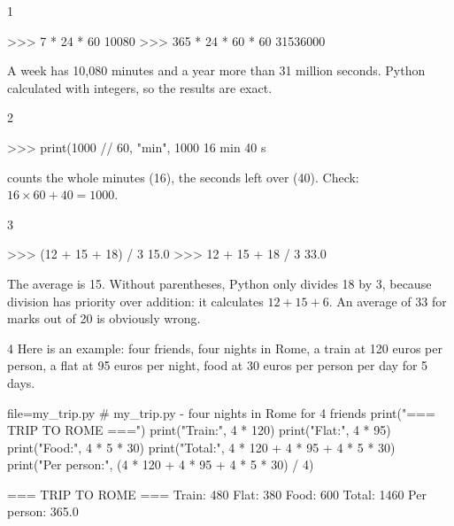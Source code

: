 
\begin{corrigeatoi}{1}
\begin{console}
>>> 7 * 24 * 60
10080
>>> 365 * 24 * 60 * 60
31536000
\end{console}
A week has 10,080 minutes and a year more than 31 million seconds. Python calculated with integers,
so the results are exact.
\end{corrigeatoi}

\begin{corrigeatoi}{2}
\begin{console}
>>> print(1000 // 60, "min", 1000 %
16 min 40 s
\end{console}
 counts the whole minutes (16),  the seconds left over (40). Check:
$16 \times 60 + 40 = 1000$.
\end{corrigeatoi}

\begin{corrigeatoi}{3}
\begin{console}
>>> (12 + 15 + 18) / 3
15.0
>>> 12 + 15 + 18 / 3
33.0
\end{console}
The average is 15. Without parentheses, Python only divides 18 by 3, because division has priority
over addition: it calculates $12 + 15 + 6$. An average of 33 for marks out of 20 is obviously wrong.
\end{corrigeatoi}

\begin{corrigeatoi}{4}
Here is an example: four friends, four nights in Rome, a train at 120 euros per person, a flat at
95 euros per night, food at 30 euros per person per day for 5 days.
\begin{code}{file=my_trip.py}
# my_trip.py - four nights in Rome for 4 friends
print("=== TRIP TO ROME ===")
print("Train:", 4 * 120)
print("Flat:", 4 * 95)
print("Food:", 4 * 5 * 30)
print("Total:", 4 * 120 + 4 * 95 + 4 * 5 * 30)
print("Per person:", (4 * 120 + 4 * 95 + 4 * 5 * 30) / 4)
\end{code}
\begin{sortie}
=== TRIP TO ROME ===
Train: 480
Flat: 380
Food: 600
Total: 1460
Per person: 365.0
\end{sortie}
\end{corrigeatoi}

